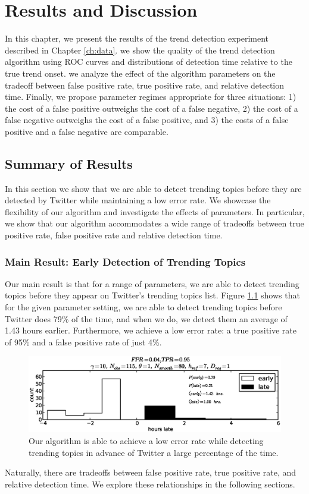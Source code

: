 \chapter{Results and Discussion}
\label{ch:results}

In this chapter, we present the results of the trend detection experiment
described in Chapter \ref{ch:data}. we show the quality of the trend detection
algorithm using ROC curves and distributions of detection time relative to the
true trend onset. we analyze the effect of the algorithm parameters on the
tradeoff between false positive rate, true positive rate, and relative detection
time. Finally, we propose parameter regimes appropriate for three situations: 1)
the cost of a false positive outweighs the cost of a false negative, 2) the cost
of a false negative outweighs the cost of a false positive, and 3) the costs of
a false positive and a false negative are comparable.

\section{Summary of Results}

In this section we show that we are able to detect trending topics before they
are detected by Twitter while maintaining a low error rate. We showcase the
flexibility of our algorithm and investigate the effects of parameters. In
particular, we show that our algorithm accommodates a wide range of tradeoffs
between true positive rate, false positive rate and relative detection time.

\subsection{Main Result: Early Detection of Trending Topics}
Our main result is that for a range of parameters, we are able to detect
trending topics before they appear on Twitter's trending topics list. Figure
\ref{fig:early} shows that for the given parameter setting, we are able to
detect trending topics before Twitter does 79\% of the time, and when we do, we
detect them an average of 1.43 hours earlier. Furthermore, we achieve a low
error rate: a true positive rate of 95\% and a false positive rate of just 4\%.
\begin{figure}[!h]
\begin{center}
\includegraphics[width=6in]{../fig/final/twitter_killer/ex2}
\end{center}
\caption{\label{fig:early} Our algorithm is able to achieve a low error rate
  while detecting trending topics in advance of Twitter a large percentage of
  the time.}
\end{figure}
Naturally, there are tradeoffs between false positive rate, true positive rate,
and relative detection time. We explore these relationships in the following
sections.

